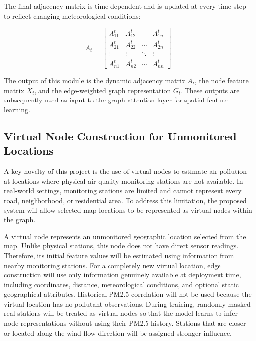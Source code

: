 The final adjacency matrix is time-dependent and is updated at every time step to reflect changing meteorological conditions:

\begin{equation}
A_t =
\begin{bmatrix}
A_{11}^t & A_{12}^t & \cdots & A_{1n}^t \\
A_{21}^t & A_{22}^t & \cdots & A_{2n}^t \\
\vdots & \vdots & \ddots & \vdots \\
A_{n1}^t & A_{n2}^t & \cdots & A_{nn}^t
\end{bmatrix}
\end{equation}

The output of this module is the dynamic adjacency matrix $A_t$, the node feature matrix $X_t$, and the edge-weighted graph representation $G_t$. These outputs are subsequently used as input to the graph attention layer for spatial feature learning.

\subsection{Virtual Node Construction for Unmonitored Locations}

A key novelty of this project is the use of virtual nodes to estimate air pollution at locations where physical air quality monitoring stations are not available. In real-world settings, monitoring stations are limited and cannot represent every road, neighborhood, or residential area. To address this limitation, the proposed system will allow selected map locations to be represented as virtual nodes within the graph.

A virtual node represents an unmonitored geographic location selected from the map. Unlike physical stations, this node does not have direct sensor readings. Therefore, its initial feature values will be estimated using information from nearby monitoring stations. For a completely new virtual location, edge construction will use only information genuinely available at deployment time, including coordinates, distance, meteorological conditions, and optional static geographical attributes. Historical PM2.5 correlation will not be used because the virtual location has no pollutant observations. During training, randomly masked real stations will be treated as virtual nodes so that the model learns to infer node representations without using their PM2.5 history. Stations that are closer or located along the wind flow direction will be assigned stronger influence.

